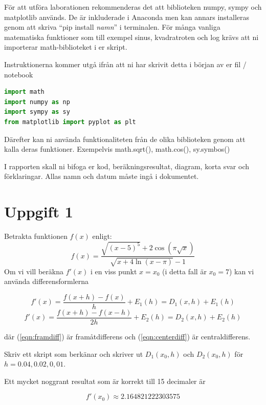 \documentclass[a4paper]{article}
\begin{document}
För att utföra laborationen rekommenderas det att biblioteken numpy,
sympy och matplotlib används. De är inkluderade i Anaconda men kan annars installeras genom att
skriva ``pip install \textit{namn}'' i terminalen. För många vanliga matematiska funktioner som till
exempel sinus, kvadratroten och log krävs att ni importerar math-biblioteket i er skript.

Instruktionerna kommer utgå ifrån att ni har skrivit detta i början av er fil / notebook
\begin{lstlisting}[language=Python]
import math 
import numpy as np
import sympy as sy
from matplotlib import pyplot as plt
\end{lstlisting}

Därefter kan ni använda funktionaliteten från de olika biblioteken genom att
kalla deras funktioner. Exempelvis math.sqrt(), math.cos(), sy.symbos()

I rapporten skall ni bifoga er kod, beräkningsresultat, diagram, korta svar och förklaringar.
Allas namn och datum måste ingå i dokumentet.

\newpage
\section{Uppgift 1}

Betrakta funktionen \( f(x) \) enligt:
\begin{equation} \label{eqn:fxq1}
  f(x)=\frac{\sqrt{(x-5)^5}+2\cos (\pi\sqrt{x})}{\sqrt{x+4 \ln (x-\pi)}-1}
\end{equation}
Om vi vill beräkna \( f'(x) \) i en viss punkt \( x=x_0 \)
(i detta fall är \( x_0=7 \)) kan vi använda differensformlerna

\begin{equation} \label{eqn:framdiff}
  f'(x)=\frac{f(x+h)-f(x)}{h}+E_1(h)=D_1(x,h)+E_1(h)
\end{equation}
\begin{equation} \label{eqn:centerdiff}
  f'(x)=\frac{f(x+h)-f(x-h)}{2h}+E_2(h)=D_2(x,h)+E_2(h)
\end{equation}

där (\ref{eqn:framdiff}) är framåtdifferens och (\ref{eqn:centerdiff}) är centraldifferens.

Skriv ett skript som berkänar och skriver ut \( D_1(x_0,h) \)
och  \( D_2(x_0,h) \) för \( h=0.04,0.02,0,01 \).

Ett mycket noggrant resultat som är korrekt till 15 decimaler är

\begin{equation} \label{eqn:fxexakt}
  f'(x_0)\approx 2.164821222303575
\end{equation}
\end{document}
